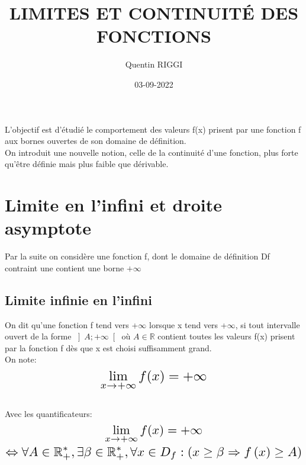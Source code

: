 \documentclass[a4paper, 10pt]{article}
\title{\color{dark-red}\Huge LIMITES ET CONTINUITÉ DES FONCTIONS}
\date{03-09-2022}
\author{Quentin RIGGI}
\renewcommand{\large}{\color{text}}
\renewcommand{\textbf}{\color{crimson}}
\begin{document}
	\maketitle
	\large L'objectif est d'étudié le comportement des valeurs f(x) prisent par une fonction f aux bornes ouvertes de son domaine de définition.\\
	\large On introduit une nouvelle notion, celle de la continuité d'une fonction, plus forte qu'être définie mais plus faible que dérivable.
	
	
	\section{Limite en l'infini et droite asymptote}	
	\large Par la suite on considère une fonction f, dont le domaine de définition Df contraint une contient une borne $+\infty$ 

	\begin{center}
		\subsection*{Limite infinie en l'infini}	
	\end{center}
	\textbf{Definition:}
	\large On dit qu'une fonction f tend vers +$\infty$ lorsque x tend vers +$\infty$, si tout intervalle ouvert de la forme
	$\left]A; +\infty \right[$ où $A\in\mathbb{R}$ contient toutes les valeurs f(x) prisent par la fonction f dès que x est choisi suffisamment grand.\\
	\large On note:
	\begin{displaymath}
		\scaleto{\lim_{x\to+\infty} f(x) = +\infty}{25pt}
	\end{displaymath}
	\\
	\large Avec les quantificateurs:
	\begin{gather*}
		\scaleto{\lim_{x\to+\infty} f(x) = +\infty}{25pt} 
		\\
		\scaleto{\Leftrightarrow\forall A \in\mathbb{R}_{+}^{*},\exists\beta\in\mathbb{R}_{+}^{*},\forall x \in D_{f} : \left(x\geq\beta\Rightarrow f\left(x\right)\geq A \right)}{18pt}
	\end{gather*}
	
	\begin{center}
	\end{center}
	
\end{document}
